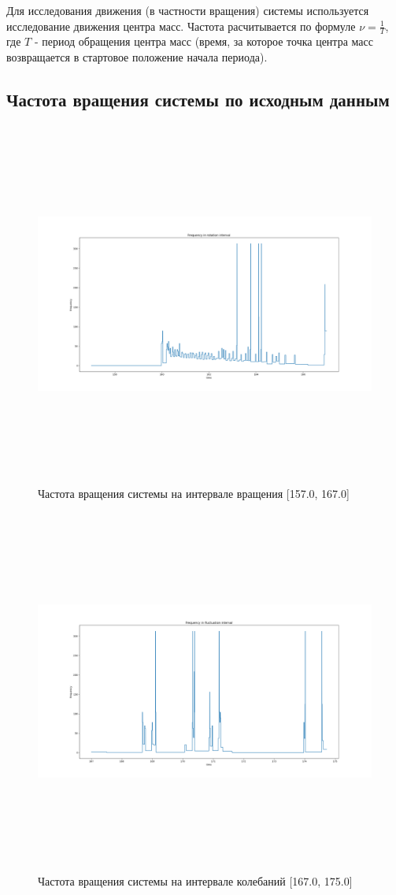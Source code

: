 \documentclass[a4paper,12pt]{article} %
\begin{document}
	Для исследования движения (в частности вращения) системы используется исследование движения центра масс. Частота расчитывается по формуле $\nu = \frac{1}{T}$, где $T$ - период обращения центра масс (время, за которое точка центра масс возвращается в стартовое положение начала периода).
	\subsection{Частота вращения системы по исходным данным}
	\begin{figure}[H]
		\centering
		\includegraphics[width = 18cm, height = 12cm]{Rot_origin.png}
		\caption{Частота вращения системы на интервале вращения [157.0, 167.0]}
		\label{fig:rot_origin}
	\end{figure}
	\begin{figure}[H]
		
		\includegraphics[width = 18cm, height = 12cm]{Fluct_origin.png}
		\caption{Частота вращения системы на интервале колебаний [167.0, 175.0]}
		\label{fig:fluct_origin}
	\end{figure}
\end{document}
